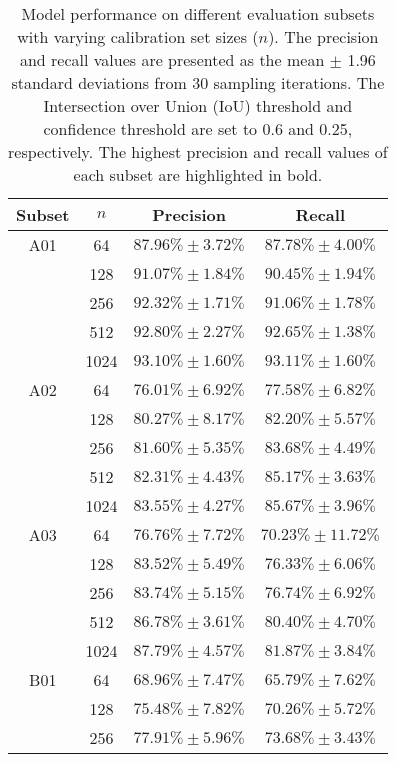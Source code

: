 \begin{table}[H]
    \centering
    \caption{Model performance on different evaluation subsets with varying calibration set sizes ($n$). The precision and recall values are presented as the mean $\pm$ 1.96 standard deviations from 30 sampling iterations. The Intersection over Union (IoU) threshold and confidence threshold are set to 0.6 and 0.25, respectively. The highest precision and recall values of each subset are highlighted in bold.}
    \label{table2}
    \begin{tabular}{cccc}
        \toprule
        \textbf{Subset} & $n$ & \textbf{Precision} & \textbf{Recall} \\
        \midrule
        A01 & 64 & $87.96\% \pm 3.72\%$ & $87.78\% \pm 4.00\%$ \\
        & 128 & $91.07\% \pm 1.84\%$ & $90.45\% \pm 1.94\%$ \\
        & 256 & $92.32\% \pm 1.71\%$ & $91.06\% \pm 1.78\%$ \\
        & 512 & $92.80\% \pm 2.27\%$ & $92.65\% \pm 1.38\%$ \\
        & 1024 & $\mathbf{93.10\% \pm 1.60\%}$ & $\mathbf{93.11\% \pm 1.60\%}$ \\
        \midrule
        A02 & 64 & $76.01\% \pm 6.92\%$ & $77.58\% \pm 6.82\%$ \\
        & 128 & $80.27\% \pm 8.17\%$ & $82.20\% \pm 5.57\%$ \\
        & 256 & $81.60\% \pm 5.35\%$ & $83.68\% \pm 4.49\%$ \\
        & 512 & $82.31\% \pm 4.43\%$ & $85.17\% \pm 3.63\%$ \\
        & 1024 & $\mathbf{83.55\% \pm 4.27\%}$ & $\mathbf{85.67\% \pm 3.96\%}$ \\
        \midrule
        A03 & 64 & $76.76\% \pm 7.72\%$ & $70.23\% \pm 11.72\%$ \\
        & 128 & $83.52\% \pm 5.49\%$ & $76.33\% \pm 6.06\%$ \\
        & 256 & $83.74\% \pm 5.15\%$ & $76.74\% \pm 6.92\%$ \\
        & 512 & $86.78\% \pm 3.61\%$ & $80.40\% \pm 4.70\%$ \\
        & 1024 & $\mathbf{87.79\% \pm 4.57\%}$ & $\mathbf{81.87\% \pm 3.84\%}$ \\
        \midrule
        B01 & 64 & $68.96\% \pm 7.47\%$ & $65.79\% \pm 7.62\%$ \\
        & 128 & $75.48\% \pm 7.82\%$ & $70.26\% \pm 5.72\%$ \\
        & 256 & $77.91\% \pm 5.96\%$ & $73.68\% \pm 3.43\%$ \\

\end{tabular}
\end{table}
